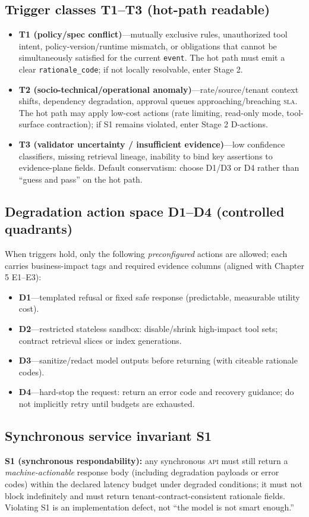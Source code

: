 \documentclass[11pt,a4paper]{report}
\begin{document}
\subsection{Trigger classes T1--T3 (hot-path readable)}
\begin{itemize}
  \item \textbf{T1 (policy/spec conflict)}—mutually exclusive rules, unauthorized tool intent, policy-version/runtime mismatch, or obligations that cannot be simultaneously satisfied for the current \texttt{event}. The hot path must emit a clear \texttt{rationale\_code}; if not locally resolvable, enter Stage 2.
  \item \textbf{T2 (socio-technical/operational anomaly)}—rate/source/tenant context shifts, dependency degradation, approval queues approaching/breaching \textsc{sla}. The hot path may apply low-cost actions (rate limiting, read-only mode, tool-surface contraction); if S1 remains violated, enter Stage 2 D-actions.
  \item \textbf{T3 (validator uncertainty / insufficient evidence)}—low confidence classifiers, missing retrieval lineage, inability to bind key assertions to evidence-plane fields. Default conservatism: choose D1/D3 or D4 rather than “guess and pass” on the hot path.
\end{itemize}

\subsection{Degradation action space D1--D4 (controlled quadrants)}
When triggers hold, only the following \emph{preconfigured} actions are allowed; each carries business-impact tags and required evidence columns (aligned with Chapter 5 E1--E3):
\begin{itemize}
  \item \textbf{D1}—templated refusal or fixed safe response (predictable, measurable utility cost).
  \item \textbf{D2}—restricted stateless sandbox: disable/shrink high-impact tool sets; contract retrieval slices or index generations.
  \item \textbf{D3}—sanitize/redact model outputs before returning (with citeable rationale codes).
  \item \textbf{D4}—hard-stop the request: return an error code and recovery guidance; do not implicitly retry until budgets are exhausted.
\end{itemize}

\subsection{Synchronous service invariant S1}
\textbf{S1 (synchronous respondability):} any synchronous \textsc{api} must still return a \emph{machine-actionable} response body (including degradation payloads or error codes) within the declared latency budget under degraded conditions; it must not block indefinitely and must return tenant-contract-consistent rationale fields. Violating S1 is an implementation defect, not “the model is not smart enough.”
\end{document}
